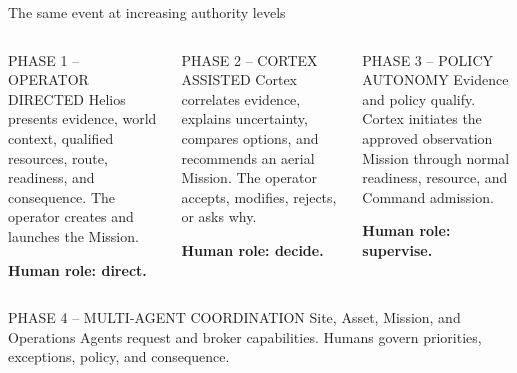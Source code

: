 \documentclass[aspectratio=169,10pt]{beamer}
\begin{document}
\begin{frame}{The same event at increasing authority levels}
\begin{columns}[T]
\begin{block}{PHASE 1 -- OPERATOR DIRECTED}
\small Helios presents evidence, world context, qualified resources, route, readiness, and consequence. The operator creates and launches the Mission.\vspace{2mm}\par
{\color{green}\bfseries Human role: direct.}
\end{block}
\begin{block}{PHASE 2 -- CORTEX ASSISTED}
\small Cortex correlates evidence, explains uncertainty, compares options, and recommends an aerial Mission. The operator accepts, modifies, rejects, or asks why.\vspace{2mm}\par
{\color{amber}\bfseries Human role: decide.}
\end{block}
\begin{block}{PHASE 3 -- POLICY AUTONOMY}
\small Evidence and policy qualify. Cortex initiates the approved observation Mission through normal readiness, resource, and Command admission.\vspace{2mm}\par
{\color{blue}\bfseries Human role: supervise.}
\end{block}
\end{columns}
\vspace{4mm}
\begin{block}{PHASE 4 -- MULTI-AGENT COORDINATION}
\centering Site, Asset, Mission, and Operations Agents request and broker capabilities. Humans govern priorities, exceptions, policy, and consequence.
\end{block}
\end{frame}
\end{document}
